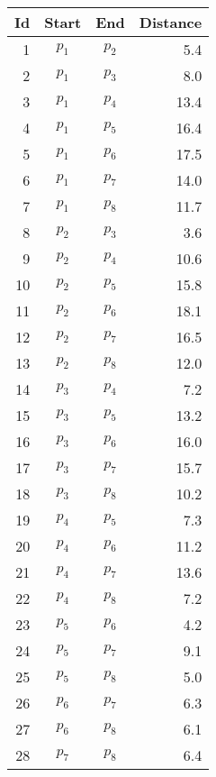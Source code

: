 \documentclass[
	final,
	a4paper,
	oneside,
	parskip=full,
	headings=standardclasses,
	headings=big,
	pointednumbers
]{scrartcl}
\begin{document}
    \begin{minipage}[t]{.5\linewidth}
        \begin{center}
            \begin{tabular}[t]{|r|c|c|r|}
                \hline
                \textbf{Id} & \textbf{Start} & \textbf{End} & \textbf{Distance} \\
                \hline
                1 & $p_{1}$ & $p_{2}$ & 5.4 \\
                2 & $p_{1}$ & $p_{3}$ & 8.0 \\
                3 & $p_{1}$ & $p_{4}$ & 13.4 \\
                4 & $p_{1}$ & $p_{5}$ & 16.4 \\
                5 & $p_{1}$ & $p_{6}$ & 17.5 \\
                6 & $p_{1}$ & $p_{7}$ & 14.0 \\
                7 & $p_{1}$ & $p_{8}$ & 11.7 \\
                \hline
                8 & $p_{2}$ & $p_{3}$ & 3.6 \\
                9 & $p_{2}$ & $p_{4}$ & 10.6 \\
                10 & $p_{2}$ & $p_{5}$ & 15.8 \\
                11 & $p_{2}$ & $p_{6}$ & 18.1 \\
                12 & $p_{2}$ & $p_{7}$ & 16.5 \\
                13 & $p_{2}$ & $p_{8}$ & 12.0 \\
                \hline
                14 & $p_{3}$ & $p_{4}$ & 7.2 \\
                15 & $p_{3}$ & $p_{5}$ & 13.2 \\
                16 & $p_{3}$ & $p_{6}$ & 16.0 \\
                17 & $p_{3}$ & $p_{7}$ & 15.7 \\
                18 & $p_{3}$ & $p_{8}$ & 10.2 \\
                \hline
                19 & $p_{4}$ & $p_{5}$ & 7.3 \\
                20 & $p_{4}$ & $p_{6}$ & 11.2 \\
                21 & $p_{4}$ & $p_{7}$ & 13.6 \\
                22 & $p_{4}$ & $p_{8}$ & 7.2 \\
                \hline
                23 & $p_{5}$ & $p_{6}$ & 4.2 \\
                24 & $p_{5}$ & $p_{7}$ & 9.1 \\
                25 & $p_{5}$ & $p_{8}$ & 5.0 \\
                \hline
                26 & $p_{6}$ & $p_{7}$ & 6.3 \\
                27 & $p_{6}$ & $p_{8}$ & 6.1 \\
                \hline
                28 & $p_{7}$ & $p_{8}$ & 6.4 \\
                \hline
            \end{tabular}
        \end{center}
    \end{minipage}
\end{document}
